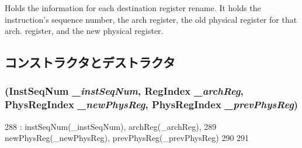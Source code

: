 Holds the information for each destination register rename. It holds the instruction's sequence number, the arch register, the old physical register for that arch. register, and the new physical register. 

\subsection{コンストラクタとデストラクタ}
\hypertarget{structDefaultRename_1_1RenameHistory_a5fc311f775dc87c62fc03af784ab25d0}{
\subsubsection[{RenameHistory}]{ ({\bf InstSeqNum} {\em \_\-instSeqNum}, \/  {\bf RegIndex} {\em \_\-archReg}, \/  {\bf PhysRegIndex} {\em \_\-newPhysReg}, \/  {\bf PhysRegIndex} {\em \_\-prevPhysReg})}}
\label{structDefaultRename_1_1RenameHistory_a5fc311f775dc87c62fc03af784ab25d0}



\begin{DoxyCode}
288             : instSeqNum(_instSeqNum), archReg(_archReg),
289               newPhysReg(_newPhysReg), prevPhysReg(_prevPhysReg)
290         {
291         }
\end{DoxyCode}


